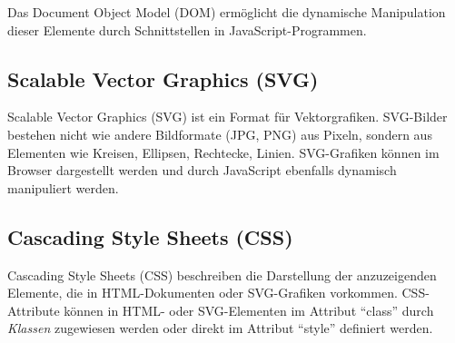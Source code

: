 Das Document Object Model (DOM) ermöglicht die dynamische Manipulation dieser Elemente durch Schnittstellen in JavaScript-Programmen.

\subsection{Scalable Vector Graphics (SVG)}

Scalable Vector Graphics (SVG) ist ein Format für Vektorgrafiken. SVG-Bilder bestehen nicht wie andere Bildformate (JPG, PNG) aus Pixeln, sondern aus Elementen wie Kreisen, Ellipsen, Rechtecke, Linien. SVG-Grafiken können im Browser dargestellt werden und durch JavaScript ebenfalls dynamisch manipuliert werden.

\subsection{Cascading Style Sheets (CSS)}

Cascading Style Sheets (CSS) beschreiben die Darstellung der anzuzeigenden Elemente, die in HTML-Dokumenten oder SVG-Grafiken vorkommen. CSS-Attribute können in HTML- oder SVG-Elementen im Attribut "`class"' durch \textit{Klassen} zugewiesen werden oder direkt im Attribut "`style"' definiert werden.